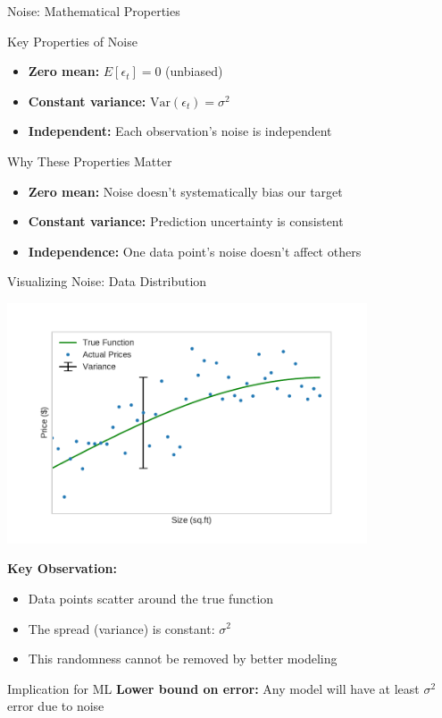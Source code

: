 \documentclass[10pt]{beamer}
\newcommand{\fitpic}[1]{\begin{adjustbox}{max width=\linewidth, max totalheight=0.78\textheight}#1\end{adjustbox}}
\begin{document}
\begin{frame}{Noise: Mathematical Properties}
\begin{definitionbox}{Key Properties of Noise}
\begin{itemize}
\item \textbf{Zero mean:} $E[\epsilon_t] = 0$ (unbiased)
\item \textbf{Constant variance:} $\text{Var}(\epsilon_t) = \sigma^2$
\item \textbf{Independent:} Each observation's noise is independent
\end{itemize}
\end{definitionbox}

\begin{keypointsbox}{Why These Properties Matter}
\begin{itemize}
\item \textbf{Zero mean:} Noise doesn't systematically bias our target
\item \textbf{Constant variance:} Prediction uncertainty is consistent
\item \textbf{Independence:} One data point's noise doesn't affect others
\end{itemize}
\end{keypointsbox}
\end{frame}

\begin{frame}{Visualizing Noise: Data Distribution}
\begin{center}
\fitpic{\includegraphics[width=0.8\textwidth]{../assets/bias-variance/figures/data_var.pdf}}
\end{center}

\begin{keypointsbox}
\textbf{Key Observation:} 
\begin{itemize}
\item Data points scatter around the true function
\item The spread (variance) is constant: $\sigma^2$
\item This randomness cannot be removed by better modeling
\end{itemize}
\end{keypointsbox}

\begin{alertbox}{Implication for ML}
\textbf{Lower bound on error:} Any model will have at least $\sigma^2$ error due to noise
\end{alertbox}
\end{frame}
\end{document}
